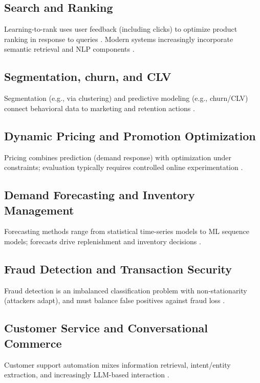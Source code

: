 \subsection{Search and Ranking}
Learning-to-rank uses user feedback (including clicks) to optimize product ranking in response to queries \citep{joachims2002ltr}.
Modern systems increasingly incorporate semantic retrieval and NLP components \citep{jurafsky2023slp}.

\subsection{Segmentation, churn, and CLV}
Segmentation (e.g., via clustering) and predictive modeling (e.g., churn/CLV) connect behavioral data to marketing and retention actions \citep{hastie2009esl}.

\subsection{Dynamic Pricing and Promotion Optimization}
Pricing combines prediction (demand response) with optimization under constraints; evaluation typically requires controlled online experimentation \citep{laudon2024ecommerce,hastie2009esl}.

\subsection{Demand Forecasting and Inventory Management}
Forecasting methods range from statistical time-series models to ML sequence models; forecasts drive replenishment and inventory decisions \citep{ngai2011ec,hastie2009esl}.

\subsection{Fraud Detection and Transaction Security}
Fraud detection is an imbalanced classification problem with non-stationarity (attackers adapt), and must balance false positives against fraud loss \citep{dalpozzolo2015fraud,hastie2009esl}.

\subsection{Customer Service and Conversational Commerce}
Customer support automation mixes information retrieval, intent/entity extraction, and increasingly LLM-based interaction \citep{jurafsky2023slp}.

